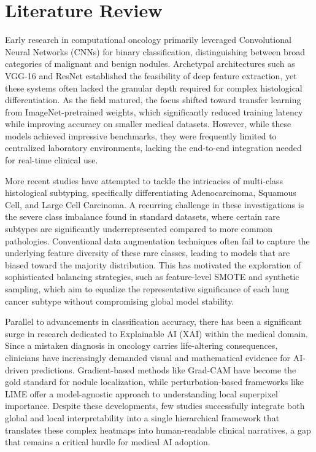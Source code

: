\documentclass[conference]{IEEEtran}
\begin{document}
\section{Literature Review}

Early research in computational oncology primarily leveraged Convolutional Neural Networks (CNNs) for binary classification, distinguishing between broad categories of malignant and benign nodules. Archetypal architectures such as VGG-16 and ResNet established the feasibility of deep feature extraction, yet these systems often lacked the granular depth required for complex histological differentiation. As the field matured, the focus shifted toward transfer learning from ImageNet-pretrained weights, which significantly reduced training latency while improving accuracy on smaller medical datasets. However, while these models achieved impressive benchmarks, they were frequently limited to centralized laboratory environments, lacking the end-to-end integration needed for real-time clinical use.

More recent studies have attempted to tackle the intricacies of multi-class histological subtyping, specifically differentiating Adenocarcinoma, Squamous Cell, and Large Cell Carcinoma. A recurring challenge in these investigations is the severe class imbalance found in standard datasets, where certain rare subtypes are significantly underrepresented compared to more common pathologies. Conventional data augmentation techniques often fail to capture the underlying feature diversity of these rare classes, leading to models that are biased toward the majority distribution. This has motivated the exploration of sophisticated balancing strategies, such as feature-level SMOTE and synthetic sampling, which aim to equalize the representative significance of each lung cancer subtype without compromising global model stability.

Parallel to advancements in classification accuracy, there has been a significant surge in research dedicated to Explainable AI (XAI) within the medical domain. Since a mistaken diagnosis in oncology carries life-altering consequences, clinicians have increasingly demanded visual and mathematical evidence for AI-driven predictions. Gradient-based methods like Grad-CAM have become the gold standard for nodule localization, while perturbation-based frameworks like LIME offer a model-agnostic approach to understanding local superpixel importance. Despite these developments, few studies successfully integrate both global and local interpretability into a single hierarchical framework that translates these complex heatmaps into human-readable clinical narratives, a gap that remains a critical hurdle for medical AI adoption.
\end{document}
